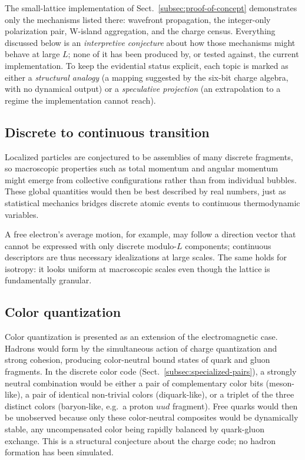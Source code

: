 \documentclass{ijuc}
\begin{document}
The small-lattice implementation of Sect.~\ref{subsec:proof-of-concept} demonstrates only the mechanisms listed there: wavefront propagation, the integer-only polarization pair, W-island aggregation, and the charge census.  Everything discussed below is an \emph{interpretive conjecture} about how those mechanisms might behave at large $L$; none of it has been produced by, or tested against, the current implementation.  To keep the evidential status explicit, each topic is marked as either a \emph{structural analogy} (a mapping suggested by the six-bit charge algebra, with no dynamical output) or a \emph{speculative projection} (an extrapolation to a regime the implementation cannot reach).

\subsection{Discrete to continuous transition}

Localized particles are conjectured to be assemblies of many discrete fragments, so macroscopic properties such as total momentum and angular momentum might emerge from collective configurations rather than from individual bubbles. These global quantities would then be best described by real numbers, just as statistical mechanics bridges discrete atomic events to continuous thermodynamic variables.

A free electron's average motion, for example, may follow a direction vector that cannot be expressed with only discrete modulo-$L$ components; continuous descriptors are thus necessary idealizations at large scales. The same holds for isotropy: it looks uniform at macroscopic scales even though the lattice is fundamentally granular.

\subsection{Color quantization}
Color quantization is presented as an extension of the electromagnetic case. 
Hadrons would form by the simultaneous action of charge quantization and strong cohesion, producing color-neutral bound states of quark and gluon fragments. In the discrete color code (Sect.~\ref{subsec:specialized-pairs}), a strongly neutral combination would be either a pair of complementary color bits (meson-like), a pair of identical non-trivial colors (diquark-like), or a triplet of the three distinct colors (baryon-like, e.g.\ a proton $uud$ fragment). Free quarks would then be unobserved because only these color-neutral composites would be dynamically stable, any uncompensated color being rapidly balanced by quark-gluon exchange. This is a structural conjecture about the charge code; no hadron formation has been simulated.
\end{document}
